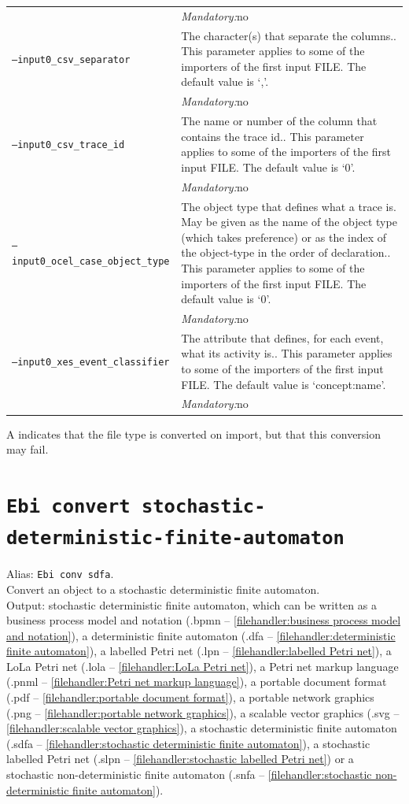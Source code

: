 {\begin{tabularx}{\linewidth}{lX}
&\textit{Mandatory:}\quad no\\
\texttt{--input0\_csv\_separator} & The character(s) that separate the columns.. This parameter applies to some of the importers of the first input FILE. The default value is `,'.\\
&\textit{Mandatory:}\quad no\\
\texttt{--input0\_csv\_trace\_id} & The name or number of the column that contains the trace id.. This parameter applies to some of the importers of the first input FILE. The default value is `0'.\\
&\textit{Mandatory:}\quad no\\
\texttt{--input0\_ocel\_case\_object\_type} & The object type that defines what a trace is. May be given as the name of the object type (which takes preference) or as the index of the object-type in the order of declaration.. This parameter applies to some of the importers of the first input FILE. The default value is `0'.\\
&\textit{Mandatory:}\quad no\\
\texttt{--input0\_xes\_event\_classifier} & The attribute that defines, for each event, what its activity is.. This parameter applies to some of the importers of the first input FILE. The default value is `concept:name'.\\
&\textit{Mandatory:}\quad no\\
\bottomrule
\end{tabularx}
A \textdagger{} indicates that the file type is converted on import, but that this conversion may fail.
\clearpage\section{\texttt{Ebi convert stochastic-deterministic-finite-automaton}}
\label{command:Ebi convert stochastic-deterministic-finite-automaton}
Alias: \texttt{Ebi conv sdfa}.\\
Convert an object to a stochastic deterministic finite automaton.\\
\noindent Output: stochastic deterministic finite automaton, which can be written as a business process model and notation (.bpmn -- \cref{filehandler:business process model and notation}), a deterministic finite automaton (.dfa -- \cref{filehandler:deterministic finite automaton}), a labelled Petri net (.lpn -- \cref{filehandler:labelled Petri net}), a LoLa Petri net (.lola -- \cref{filehandler:LoLa Petri net}), a Petri net markup language (.pnml -- \cref{filehandler:Petri net markup language}), a portable document format (.pdf -- \cref{filehandler:portable document format}), a portable network graphics (.png -- \cref{filehandler:portable network graphics}), a scalable vector graphics (.svg -- \cref{filehandler:scalable vector graphics}), a stochastic deterministic finite automaton (.sdfa -- \cref{filehandler:stochastic deterministic finite automaton}), a stochastic labelled Petri net (.slpn -- \cref{filehandler:stochastic labelled Petri net}) or a stochastic non-deterministic finite automaton (.snfa -- \cref{filehandler:stochastic non-deterministic finite automaton}).\\
}
